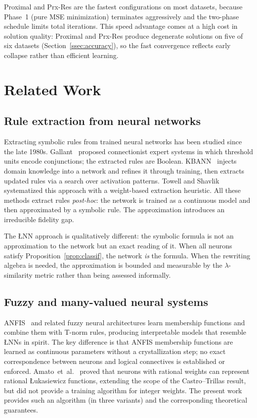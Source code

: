 \documentclass[lettersize,journal]{IEEEtran}
\newcommand{\LNN}{\L{}NN}
\begin{document}
Proximal and Prx-Res are the fastest configurations on most datasets, because
Phase~1 (pure MSE minimization) terminates aggressively and the two-phase
schedule limits total iterations.
This speed advantage comes at a high cost in solution quality:
Proximal and Prx-Res produce degenerate solutions on five of six datasets
(Section~\ref{ssec:accuracy}), so the fast convergence reflects early
collapse rather than efficient learning.

\section{Related Work}
\label{sec:related}

\subsection{Rule extraction from neural networks}

Extracting symbolic rules from trained neural networks has been studied since
the late 1980s.
Gallant~\cite{gallant1988} proposed connectionist expert systems in which
threshold units encode conjunctions; the extracted rules are Boolean.
KBANN~\cite{towell1994} injects domain knowledge into a network and refines it
through training, then extracts updated rules via a search over activation patterns.
Towell and Shavlik~\cite{towell1993} systematized this approach with a
weight-based extraction heuristic.
All these methods extract rules \emph{post-hoc}: the network is trained as a
continuous model and then approximated by a symbolic rule.
The approximation introduces an irreducible fidelity gap.

The \LNN{} approach is qualitatively different: the symbolic formula is not an
approximation to the network but an exact reading of it.
When all neurons satisfy Proposition~\ref{prop:classif}, the network \emph{is}
the formula.
When the rewriting algebra is needed, the approximation is bounded and
measurable by the $\lambda$-similarity metric rather than being assessed
informally.

\subsection{Fuzzy and many-valued neural systems}

ANFIS~\cite{jang1993} and related fuzzy neural architectures learn
membership functions and combine them with T-norm rules, producing interpretable
models that resemble \LNN{}s in spirit.
The key difference is that ANFIS membership functions are learned as continuous
parameters without a crystallization step; no exact correspondence between
neurons and logical connectives is established or enforced.
Amato~et~al.~\cite{amato2002} proved that neurons with rational weights can
represent rational \L{}ukasiewicz functions, extending the scope of the
Castro--Trillas result, but did not provide a training algorithm for integer
weights.
The present work provides such an algorithm (in three variants) and the
corresponding theoretical guarantees.
\end{document}
